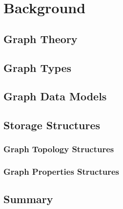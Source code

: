 {\chapter{Background}
\label{chap:Background}


\section{Graph Theory}


\section{Graph Types}


\section{Graph Data Models}


\section{Storage Structures}

\subsection{Graph Topology Structures}
\subsection{Graph Properties Structures}


\section{Summary}

}